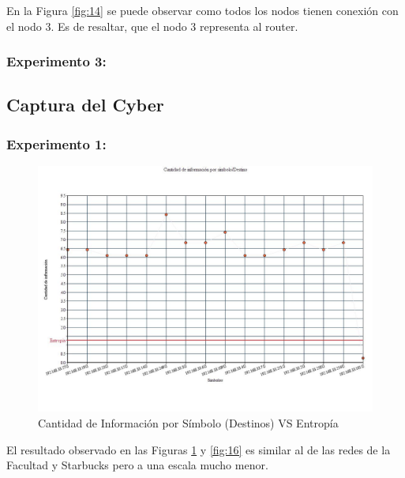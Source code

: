 En la Figura \ref{fig:14} se puede observar como todos los nodos tienen conexión con el nodo 3. Es de resaltar, que el nodo 3 representa al router.

\subsubsection{Experimento 3:}

\subsection{Captura del Cyber}

\subsubsection{Experimento 1:}

\begin{figure}[H]
  \centering
    \includegraphics[scale=0.45]{imagenes/graficos/entropiaCantInf/06destino.jpg}
  \caption{Cantidad de Información por Símbolo (Destinos) VS Entropía}
  \label{fig:15}
\end{figure}

El resultado observado en las Figuras \ref{fig:15} y \ref{fig:16} es similar al de las redes de la Facultad y Starbucks pero a una escala mucho menor.

